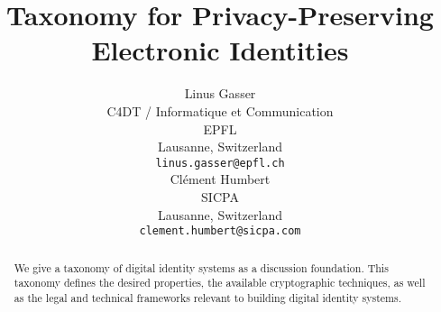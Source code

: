 \documentclass{article}
\title{Taxonomy for Privacy-Preserving Electronic Identities }
\author{
 Linus Gasser \\
  C4DT / Informatique et Communication \\
  EPFL \\
  Lausanne, Switzerland \\
  \texttt{linus.gasser@epfl.ch} \\
  \AND
 Cl\'ement Humbert \\
  SICPA \\
  Lausanne, Switzerland \\
  \texttt{clement.humbert@sicpa.com} \\
}
\begin{document}
\newcommand{\eid}{e-ID\xspace}
\newcommand{\rot}{Trust and Threats\xspace}
\newcommand{\sfi}{Solution Foundation and Implementation\xspace}
\newcommand{\rnf}{Regulatory and Normative Frameworks\xspace}
\newcommand{\swiyu}{Swiyu\xspace}

\maketitle
\begin{abstract}
We give a taxonomy of digital identity systems as a discussion foundation.
This taxonomy defines the desired properties, the available
cryptographic techniques, as well as the legal and technical
frameworks relevant to building digital identity systems.
\end{abstract}
















  

\end{document}

